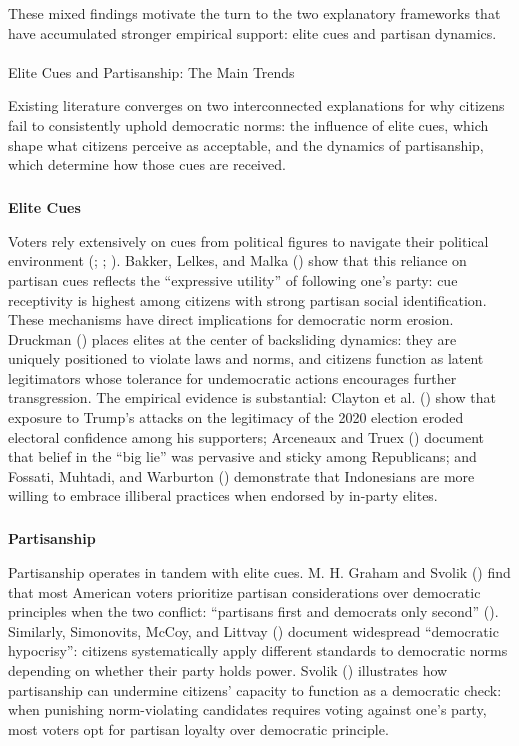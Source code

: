 \documentclass[
  10pt,
  letterpaper,
  DIV=11,
  numbers=noendperiod]{scrartcl}
\makeatletter
\let\oldparagraph\paragraph
\renewcommand{\paragraph}{
    \@ifstar
      \xxxParagraphStar
      \xxxParagraphNoStar
  }
\newcommand{\xxxParagraphStar}[1]{\oldparagraph*{#1}\mbox{}}
\newcommand{\xxxParagraphNoStar}[1]{\oldparagraph{#1}\mbox{}}
\let\oldsubparagraph\subparagraph
\renewcommand{\subparagraph}{
    \@ifstar
      \xxxSubParagraphStar
      \xxxSubParagraphNoStar
  }
\newcommand{\xxxSubParagraphStar}[1]{\oldsubparagraph*{#1}\mbox{}}
\newcommand{\xxxSubParagraphNoStar}[1]{\oldsubparagraph{#1}\mbox{}}
\makeatother
\begin{document}
These mixed findings motivate the turn to the two explanatory frameworks
that have accumulated stronger empirical support: elite cues and
partisan dynamics.

\paragraph{Elite Cues and Partisanship: The Main
Trends}\label{elite-cues-and-partisanship-the-main-trends}

Existing literature converges on two interconnected explanations for why
citizens fail to consistently uphold democratic norms: the influence of
elite cues, which shape what citizens perceive as acceptable, and the
dynamics of partisanship, which determine how those cues are received.

\subparagraph{\texorpdfstring{\textbf{Elite
Cues}}{Elite Cues}}\label{elite-cues}

Voters rely extensively on cues from political figures to navigate their
political environment (;
;
). Bakker, Lelkes,
and Malka () show that this reliance on
partisan cues reflects the ``expressive utility'' of following one's
party: cue receptivity is highest among citizens with strong partisan
social identification. These mechanisms have direct implications for
democratic norm erosion. Druckman ()
places elites at the center of backsliding dynamics: they are uniquely
positioned to violate laws and norms, and citizens function as latent
legitimators whose tolerance for undemocratic actions encourages further
transgression. The empirical evidence is substantial: Clayton et al.
() show that exposure to Trump's attacks
on the legitimacy of the 2020 election eroded electoral confidence among
his supporters; Arceneaux and Truex ()
document that belief in the ``big lie'' was pervasive and sticky among
Republicans; and Fossati, Muhtadi, and Warburton
() demonstrate that Indonesians are more
willing to embrace illiberal practices when endorsed by in-party elites.

\subparagraph{\texorpdfstring{\textbf{Partisanship}}{Partisanship}}\label{partisanship}

Partisanship operates in tandem with elite cues. M. H. Graham and Svolik
() find that most American voters
prioritize partisan considerations over democratic principles when the
two conflict: ``partisans first and democrats only second''
().
Similarly, Simonovits, McCoy, and Littvay
() document widespread ``democratic
hypocrisy'': citizens systematically apply different standards to
democratic norms depending on whether their party holds power. Svolik
() illustrates how partisanship can
undermine citizens' capacity to function as a democratic check: when
punishing norm-violating candidates requires voting against one's party,
most voters opt for partisan loyalty over democratic principle.
\end{document}

